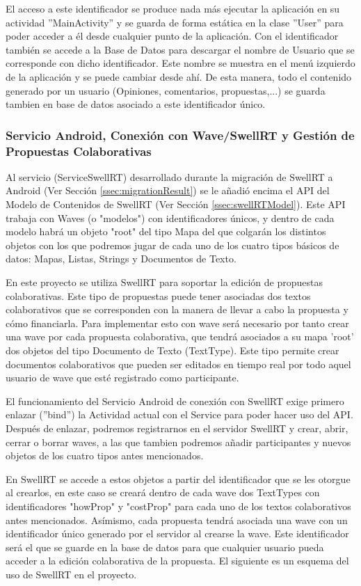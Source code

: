 		El acceso a este identificador se produce nada más ejecutar la aplicación en su actividad ''MainActivity'' y se guarda de forma estática en la clase ''User'' para poder acceder a él desde cualquier punto de la aplicación. Con el identificador también se accede a la Base de Datos para descargar el nombre de Usuario que se corresponde con dicho identificador. Este nombre se muestra en el menú izquierdo de la aplicación y se puede cambiar desde ahí. De esta manera, todo el contenido generado por un usuario (Opiniones, comentarios, propuestas,...) se guarda tambien en base de datos asociado a este identificador único.
		
	\subsubsection{Servicio Android, Conexión con Wave/SwellRT y Gestión de Propuestas Colaborativas}

		Al servicio (ServiceSwellRT) desarrollado durante la migración de SwellRT a Android (Ver Sección \ref{ssec:migrationResult}) se le añadió encima el API del Modelo de Contenidos de SwellRT (Ver Sección \ref{ssec:swellRTModel}). Este API trabaja con Waves (o "modelos") con identificadores únicos, y dentro de cada modelo habrá un objeto "root" del tipo Mapa del que colgarán los distintos objetos con los que podremos jugar de cada uno de los cuatro tipos básicos de datos: Mapas, Listas, Strings y Documentos de Texto.
		
		En este proyecto se utiliza SwellRT para soportar la edición de propuestas colaborativas. Este tipo de propuestas puede tener asociadas dos textos colaborativos que se corresponden con la manera de llevar a cabo la propuesta y cómo financiarla. Para implementar esto con wave será necesario por tanto crear una wave por cada propuesta colaborativa, que tendrá asociados a su mapa 'root' dos objetos del tipo Documento de Texto (TextType). Este tipo permite crear documentos colaborativos que pueden ser editados en tiempo real por todo aquel usuario de wave que esté registrado como participante. 
		
		El funcionamiento del Servicio Android de conexión con SwellRT exige primero enlazar (''bind'') la Actividad actual con el Service para poder hacer uso del API. Después de enlazar, podremos registrarnos en el servidor SwellRT y crear, abrir, cerrar o borrar waves, a las que tambien podremos añadir participantes y nuevos objetos de los cuatro tipos antes mencionados. 
		
		En SwellRT se accede a estos objetos a partir del identificador que se les otorgue al crearlos, en este caso se creará dentro de cada wave dos TextTypes con identificadores "howProp" y "costProp" para cada uno de los textos colaborativos antes mencionados. Asímismo, cada propuesta tendrá asociada una wave con un identificador único generado por el servidor al crearse la wave. Este identificador será el que se guarde en la base de datos para que cualquier usuario pueda acceder a la edición colaborativa de la propuesta. El siguiente es un esquema del uso de SwellRT en el proyecto.
		
